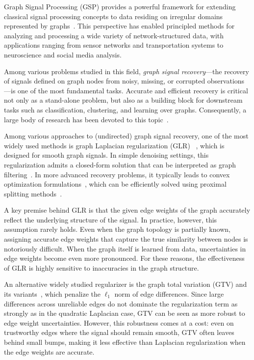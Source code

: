 Graph Signal Processing (GSP) provides a powerful framework for extending classical signal processing concepts to data residing on irregular domains represented by graphs~\cite{shuman2013emerging, sandryhaila2013discrete, ortega2018graph,leus2023graph}. 
This perspective has enabled principled methods for analyzing and processing a wide variety of network-structured data, with applications ranging from sensor networks and transportation systems to neuroscience and social media analysis. 

Among various problems studied in this field, \emph{graph signal recovery}---the recovery of signals defined on graph nodes from noisy, missing, or corrupted observations---is one of the most fundamental tasks. 
Accurate and efficient recovery is critical not only as a stand-alone problem, but also as a building block for downstream tasks such as classification, clustering, and learning over graphs. 
Consequently, a large body of research has been devoted to this topic~\cite{chen2015signal,onuki2016graph,qiu2017time,chen2021graph,chen2024manifold,yamagata2025robust}.

Among various approaches to (undirected) graph signal recovery, one of the most widely used methods is graph Laplacian regularization (GLR) ~\cite{merris1994laplacian, ando2006learning}, which is designed for smooth graph signals.
In simple denoising settings, this regularization admits a closed-form solution that can be interpreted as graph filtering~\cite{pang2017graph,zhang2019color}. 
In more advanced recovery problems, it typically leads to convex optimization formulations~\cite{dinesh2020point}, which can be efficiently solved using proximal splitting methods~\cite{combettes2011proximal,parikh2014proximal}.

A key premise behind GLR is that the given edge weights of the graph accurately reflect the underlying structure of the signal. 
In practice, however, this assumption rarely holds. 
Even when the graph topology is partially known, assigning accurate edge weights that capture the true similarity between nodes is notoriously difficult. 
When the graph itself is learned from data, uncertainties in edge weights become even more pronounced. 
For these reasons, the effectiveness of GLR is highly sensitive to inaccuracies in the graph structure.

An alternative widely studied regularizer is the graph total variation (GTV) and its variants~\cite{chen2014signal,ono2015total,berger2017graph}, which penalize the $\ell_{1}$ norm of edge differences. 
Since large differences across unreliable edges do not dominate the regularization term as strongly as in the quadratic Laplacian case, GTV can be seen as more robust to edge weight uncertainties. 
However, this robustness comes at a cost: even on trustworthy edges where the signal should remain smooth, GTV often leaves behind small bumps, making it less effective than Laplacian regularization when the edge weights are accurate.

